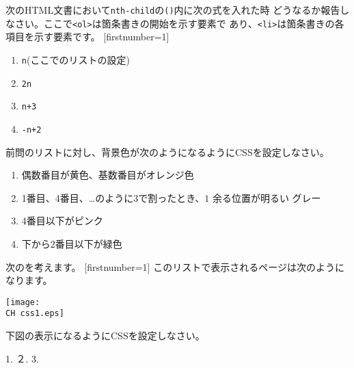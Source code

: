\begin{Problem}\upshape\label{nth-child}
次のHTML文書において\texttt{nth-child}の\texttt{()}内に次の式を入れた時
 どうなるか報告しなさい。ここで\texttt{<ol>}は箇条書きの開始を示す要素で
 あり、\texttt{<li>}は箇条書きの各項目を示す要素です。
[firstnumber=1]
\begin{enumerate}
 \item \texttt{n}(ここでのリストの設定)
 \item \texttt{2n}
 \item \texttt{n+3}
 \item \texttt{-n+2}
\end{enumerate}
\end{Problem}
\begin{Problem}\upshape
前問のリストに対し、背景色が次のようになるようにCSSを設定しなさい。
\begin{enumerate}
 \item 偶数番目が黄色、基数番目がオレンジ色
 \item 1番目、4番目、\dots のように$3$で割ったとき、$1$ 余る位置が明るい
       グレー
 \item 4番目以下がピンク
 \item 下から2番目以下が緑色
\end{enumerate}
\end{Problem}
\begin{Problem}\upshape
 次の\HTML を考えます。
 [firstnumber=1]
 このリストで表示されるページは次のようになります。
 \begin{center}
 {\texttt{[image: \\CH css1.eps]}}
 \end{center}
 
 下図の表示になるようにCSSを設定しなさい。
\begin{center}
 1. 
 ２. 
 3. 
 
\end{center}
\end{Problem}